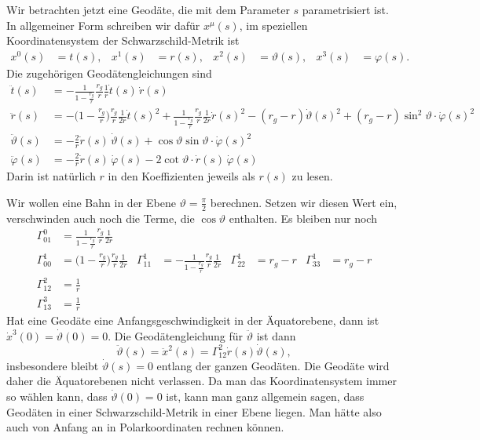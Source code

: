 Wir betrachten jetzt eine Geodäte, die mit dem Parameter $s$ parametrisiert ist.
In allgemeiner Form schreiben wir dafür $x^\mu(s)$, im speziellen
Koordinatensystem der Schwarzschild-Metrik ist
\[
\begin{aligned}
x^0(s)&=t(s),
&
x^1(s)&=r(s),
&
x^2(s)&=\vartheta(s),
&
x^3(s)&=\varphi(s).
\end{aligned}
\]
Die zugehörigen Geodätengleichungen sind
\begin{align*}
\ddot t(s)
&=
-\frac{1}{1-\displaystyle\frac{r_g}{r}}\frac{r_g}{r}\frac{1}{r}\dot t(s)\,\dot r(s)
\\
\ddot r(s)
&=
-\biggl(1-\frac{r_g}{r}\biggr)\frac{r_g}{r}\frac1{2r}\dot t(s)^2
+\frac{1}{1-\displaystyle\frac{r_g}{r}} \frac{r_g}{r}\frac1{2r}\dot r(s)^2
-(r_g-r)\dot \vartheta(s)^2 + (r_g-r)\sin^2 \vartheta \cdot \dot \varphi(s)^2
\\
\ddot \vartheta(s)
&=
-\frac{2}{r} \dot r(s)\, \dot \vartheta(s)
+\cos\vartheta\sin\vartheta \cdot \dot\varphi(s)^2
\\
\ddot \varphi(s)
&=
-\frac{2}{r} \dot r(s)\,\dot \varphi(s)
-2\cot\vartheta \cdot \dot r(s)\,\dot\varphi(s)
\end{align*}
Darin ist natürlich $r$ in den Koeffizienten jeweils als $r(s)$ zu lesen.

Wir wollen eine Bahn in der Ebene $\vartheta=\frac{\pi}2$ berechnen.
Setzen wir diesen Wert ein, verschwinden auch noch die Terme, die
$\cos\vartheta$ enthalten.
Es bleiben nur noch
\begin{equation}
\begin{aligned}
\Gamma^0_{01}
&=
\frac{1}{1-\displaystyle\frac{r_g}{r}}
\frac{r_g}{r}
\frac{1}{2r}
\\
\Gamma^1_{00}
&=
\biggl(1-\displaystyle\frac{r_g}{r}\biggr)
\frac{r_g}{r}
\frac{1}{2r}
&
\Gamma^1_{11}
&=
-\frac1{1-\displaystyle\frac{r_g}{r}}
\frac{r_g}{r}
\frac{1}{2r}
&
\Gamma^1_{22}
&=
r_g-r
&
\Gamma^1_{33}
&=
r_g-r
\\
\Gamma^2_{12}
&=
\frac1r
\\
\Gamma^3_{13}
&=
\frac1r
\end{aligned}
\label{skript:schwarzschild:christoffelaequator}
\end{equation}
Hat eine Geodäte eine Anfangsgeschwindigkeit in der Äquatorebene, dann
ist $\dot x^3(0) = \dot\vartheta(0)=0$.
Die Geodätengleichung für $\ddot \vartheta$ ist dann
\[
\ddot \vartheta(s)
=
\ddot x^2(s)
=
\Gamma^2_{12}\dot r(s)\dot \vartheta(s),
\]
insbesondere bleibt $\dot\vartheta(s)=0$ entlang der ganzen Geodäten.
Die Geodäte wird daher die Äquatorebenen nicht verlassen.
Da man das Koordinatensystem immer so wählen kann, dass $\dot\vartheta(0)=0$
ist, kann man ganz allgemein sagen, dass Geodäten in einer Schwarzschild-Metrik
in einer Ebene liegen.
Man hätte also auch von Anfang an in Polarkoordinaten rechnen können.

